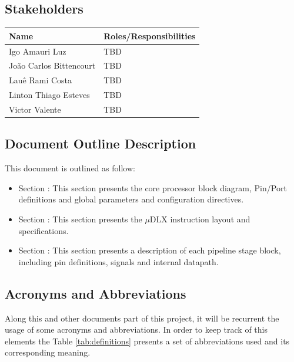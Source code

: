 \documentclass{article}
\begin{document}
  \subsection{Stakeholders}
  \FloatBarrier
  \begin{table}[H] 
    \begin{center}
      \begin{tabular}[pos]{|m{5cm} | m{8cm}|} 
        \hline %
        \cellcolor[gray]{0.9}\textbf{Name} & \cellcolor[gray]{0.9}\textbf{Roles/Responsibilities} \\ \hline
        Igo Amauri Luz & TBD \\ \hline
        João Carlos Bittencourt & TBD \\ \hline  
        Lauê Rami Costa & TBD \\ \hline
        Linton Thiago Esteves & TBD \\ \hline  
        Victor Valente & TBD \\ \hline
      \end{tabular}
    \end{center}
  \end{table}    
  
  \subsection{Document Outline Description}
  This document is outlined as follow:
	
	\begin{itemize}
	  \item Section \color{black}{\ref{sec:architecture_overview}}: This section presents the core processor block diagram, Pin/Port definitions and global parameters and configuration directives.
	  \item Section \color{black}{\ref{sec:instruction_layout}}: This section presents the $\mu$DLX instruction layout and specifications. 
    \item Section \color{black}{\ref{sec:architecture_description}}: This section presents a description of each pipeline stage block, including pin definitions, signals and internal datapath.
	\end{itemize}
		
  \subsection{Acronyms and Abbreviations}
  Along this and other documents part of this project, it will be recurrent the usage of some acronyms and abbreviations. In order to keep track of this elements the Table \ref{tab:definitions} presents a set of abbreviations used and its corresponding meaning.
  
\end{document}
